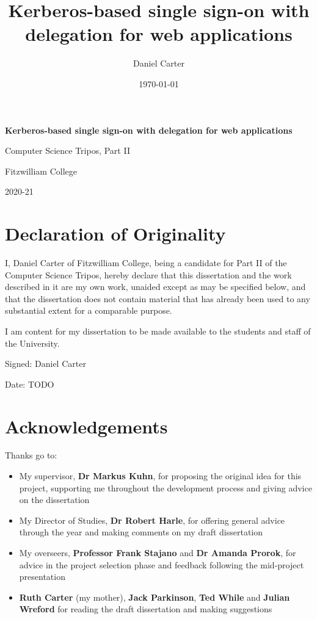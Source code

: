 \documentclass[12pt]{report}
\title{Kerberos-based single sign-on with delegation for web applications}
\author{Daniel Carter}
\date {\today}
\begin{document}

\begin{titlepage}
  \vfill
  \begin{center}
    \huge{
      \textbf{Kerberos-based single sign-on with delegation for web applications}

     Computer Science Tripos, Part II

     Fitzwilliam College

     2020-21
    }
  \end{center}
  \vfill
\end{titlepage}

\section*{Declaration of Originality}
I, Daniel Carter of Fitzwilliam College, being a candidate for Part II of the Computer Science Tripos, hereby declare that this dissertation and the work described in it are my own work, unaided except as may be specified below, and that the dissertation does not contain material that has already been used to any substantial extent for a comparable purpose.

I am content for my dissertation to be made available to the students and staff of the University.

Signed: Daniel Carter

Date: TODO

\section*{Acknowledgements}
Thanks go to:
\begin{itemize}
\item
  My supervisor, \textbf{Dr Markus Kuhn}, for proposing the original idea for this project, supporting me throughout the development process and giving advice on the dissertation
\item
  My Director of Studies, \textbf{Dr Robert Harle}, for offering general advice through the year and making comments on my draft dissertation
\item
  My overseers, \textbf{Professor Frank Stajano} and \textbf{Dr Amanda Prorok}, for advice in the project selection phase and feedback following the mid-project presentation
\item
  \textbf{Ruth Carter} (my mother), \textbf{Jack Parkinson}, \textbf{Ted While} and \textbf{Julian Wreford} for reading the draft dissertation and making suggestions
\end{itemize}
\end{document}
